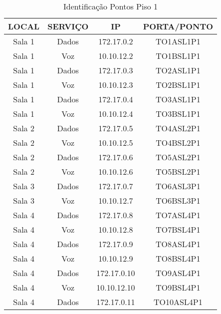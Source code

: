 \begin{table}[]
	\centering
	\caption{Identificação Pontos Piso 1}
	\label{my-label}
	\begin{tabular}{cccc}
		\hline
		\textbf{LOCAL}  & \textbf{SERVIÇO} & \textbf{IP} & \textbf{PORTA/PONTO} \\ \hline
		Sala 1          & Dados            & 172.17.0.2  & TO1ASL1P1            \\ \hline
		Sala 1          & Voz              & 10.10.12.2  & TO1BSL1P1            \\ \hline
		Sala 1          & Dados            & 172.17.0.3  & TO2ASL1P1            \\ \hline
		Sala 1          & Voz              & 10.10.12.3  & TO2BSL1P1            \\ \hline
		Sala 1          & Dados            & 172.17.0.4  & TO3ASL1P1            \\ \hline
		Sala 1          & Voz              & 10.10.12.4  & TO3BSL1P1            \\ \hline
		Sala 2          & Dados            & 172.17.0.5  & TO4ASL2P1            \\ \hline
		Sala 2          & Voz              & 10.10.12.5  & TO4BSL2P1            \\ \hline
		Sala 2          & Dados            & 172.17.0.6  & TO5ASL2P1            \\ \hline
		Sala 2          & Voz              & 10.10.12.6  & TO5BSL2P1            \\ \hline
		Sala 3          & Dados            & 172.17.0.7  & TO6ASL3P1            \\ \hline
		Sala 3          & Voz              & 10.10.12.7  & TO6BSL3P1            \\ \hline
		Sala 4          & Dados            & 172.17.0.8  & TO7ASL4P1            \\ \hline
		Sala 4          & Voz              & 10.10.12.8  & TO7BSL4P1            \\ \hline
		Sala 4          & Dados            & 172.17.0.9  & TO8ASL4P1            \\ \hline
		Sala 4          & Voz              & 10.10.12.9  & TO8BSL4P1            \\ \hline
		Sala 4          & Dados            & 172.17.0.10 & TO9ASL4P1            \\ \hline
		Sala 4          & Voz              & 10.10.12.10 & TO9BSL4P1            \\ \hline
		Sala 4          & Dados            & 172.17.0.11 & TO10ASL4P1           \\ \hline

\end{tabular}
\end{table}
